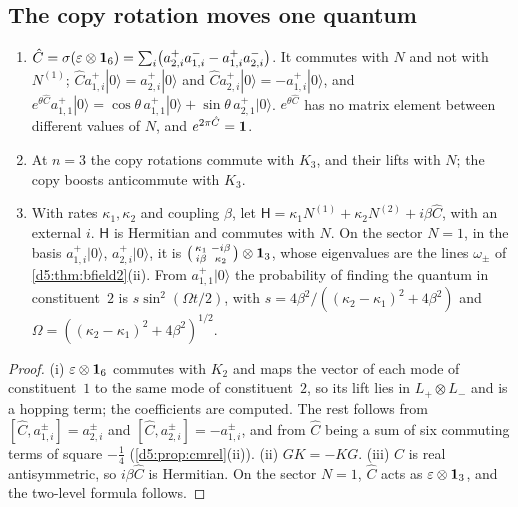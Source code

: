\subsection{The copy rotation moves one quantum}
\label{e2:sec:hop}

\begin{proposition}
\label{e2:prop:hop}
\begin{enumerate}[label=(\roman*),leftmargin=2.2em]
\item $\hat C=\sigma(\varepsilon\otimes\mathbf 1_6)=\sum_i\bigl(a^+_{2,i}a^-_{1,i}-a^+_{1,i}a^-_{2,i}\bigr)$. It commutes with $N$ and not with $N^{(1)}$;
$\hat Ca^+_{1,i}|0\rangle=a^+_{2,i}|0\rangle$ and $\hat Ca^+_{2,i}|0\rangle=-a^+_{1,i}|0\rangle$, and
$e^{\theta\hat C}a^+_{1,1}|0\rangle=\cos\theta\,a^+_{1,1}|0\rangle+\sin\theta\,a^+_{2,1}|0\rangle$. $e^{\theta\hat C}$ has no matrix element between different values
of $N$, and $e^{2\pi\hat C}=\mathbf 1$.
\item At $n=3$ the copy rotations commute with $K_3$, and their lifts with $N$; the copy boosts anticommute with $K_3$.
\item With rates $\kappa_1,\kappa_2$ and coupling $\beta$, let $\mathsf H=\kappa_1N^{(1)}+\kappa_2N^{(2)}+i\beta\hat C$, with an external $i$. $\mathsf H$ is
Hermitian and commutes with $N$. On the sector $N=1$, in the basis $a^+_{1,i}|0\rangle$, $a^+_{2,i}|0\rangle$, it is
$\bigl(\begin{smallmatrix}\kappa_1&-i\beta\\ i\beta&\kappa_2\end{smallmatrix}\bigr)\otimes\mathbf 1_3$, whose eigenvalues are the lines $\omega_\pm$ of
\cref{d5:thm:bfield2}(ii). From $a^+_{1,1}|0\rangle$ the probability of finding the quantum in constituent~$2$ is
$s\sin^2(\Omega t/2)$, with $s=4\beta^2/((\kappa_2-\kappa_1)^2+4\beta^2)$ and $\Omega=((\kappa_2-\kappa_1)^2+4\beta^2)^{1/2}$.
\end{enumerate}
\end{proposition}

\begin{proof}
(i) $\varepsilon\otimes\mathbf 1_6$ commutes with $K_2$ and maps the vector of each mode of constituent~$1$ to the same mode of constituent~$2$, so its
lift lies in $L_+\otimes L_-$ and is a hopping term; the coefficients are computed. The rest follows from $[\hat C,a^\pm_{1,i}]=a^\pm_{2,i}$ and
$[\hat C,a^\pm_{2,i}]=-a^\pm_{1,i}$, and from $\hat C$ being a sum of six commuting terms of square $-\tfrac14$ (\cref{d5:prop:cmrel}(ii)). (ii)
$GK=-KG$. (iii) $\hat C$ is real antisymmetric, so $i\beta\hat C$ is Hermitian. On the sector $N=1$, $\hat C$ acts as $\varepsilon\otimes\mathbf 1_3$, and the
two-level formula follows.
\end{proof}

